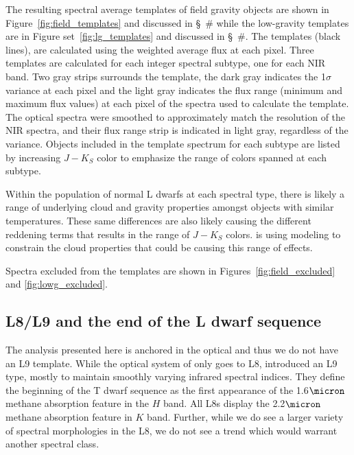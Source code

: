 \documentclass[12pt,preprint]{aastex}
\begin{document}
The resulting spectral average templates of field gravity objects are shown in Figure~\ref{fig:field_templates} and discussed in \S~\# while the low-gravity templates are in Figure set~\ref{fig:lg_templates} and discussed in \S~\#. The templates (black lines), are calculated using the weighted average flux at each pixel. 
Three templates are calculated for each integer spectral subtype, one for each NIR band. 
Two gray strips surrounds the template, the dark gray indicates the 1$\sigma$ variance at each pixel and the light gray indicates the flux range (minimum and maximum flux values) at each pixel of the spectra used to calculate the template. 
The optical spectra were smoothed to approximately match the resolution of the NIR spectra, and their flux range strip is indicated in light gray, regardless of the variance.
Objects included in the template spectrum for each subtype are listed by increasing $J-K_S$ color to emphasize the range of colors spanned at each subtype.

Within the population of normal L dwarfs at each spectral type, there is likely a range of underlying cloud and gravity properties amongst objects with similar temperatures.
These same differences are also likely causing the different reddening terms that results in the range of $J-K_S$ colors. \citet[in prep.]{Hiranaka13} is using modeling to constrain the cloud properties that could be causing this range of effects.

Spectra excluded from the templates are shown in Figures~\ref{fig:field_excluded} and \ref{fig:lowg_excluded}.

\subsection{L8/L9 and the end of the L dwarf sequence}

The analysis presented here is anchored in the optical and thus we do not have an L9 template.
While the optical system of \cite{K99} only goes to L8, \cite{Geballe02} introduced an L9 type, mostly to maintain smoothly varying infrared spectral indices.
They define the beginning of the T dwarf sequence as the first appearance of the 1.6$\micron$ methane absorption feature in the $H$ band.
All L8s display the 2.2$\micron$ methane absorption feature in $K$ band.
Further, while we do see a larger variety of spectral morphologies in the L8, we do not see a trend which would warrant another spectral class.
\end{document}
